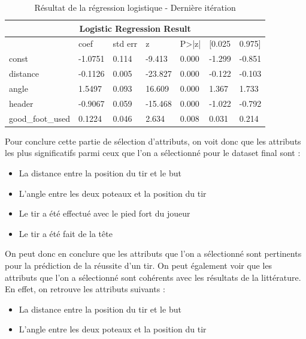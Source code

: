 \documentclass[12pt]{article}
\begin{document}
\begin{table}[htp]
    \centering
    \begin{tabular}{lllllll}
    \multicolumn{7}{c}{\textbf{Logistic Regression Result}}                                   \\ \hline
                     & coef    & std err & z       & P\textgreater{}|z| & {[}0.025 & 0.975{]} \\ \hline
    const            & -1.0751 & 0.114   & -9.413  & 0.000              & -1.299   & -0.851   \\
    distance         & -0.1126 & 0.005   & -23.827 & 0.000              & -0.122   & -0.103   \\
    angle            & 1.5497  & 0.093   & 16.609  & 0.000              & 1.367    & 1.733    \\
    header           & -0.9067 & 0.059   & -15.468 & 0.000              & -1.022   & -0.792   \\
    good\_foot\_used & 0.1224  & 0.046   & 2.634   & 0.008              & 0.031    & 0.214    \\ \hline
    \end{tabular}
    \caption{Résultat de la régression logistique - Dernière itération}
    \label{tab:logistic_regression_result_6}
\end{table}
\newpage
Pour conclure cette partie de sélection d'attributs, on voit donc que les attributs les plus significatifs parmi ceux que l'on a sélectionné pour le dataset final sont :
\begin{itemize}
    \item La distance entre la position du tir et le but
    \item L'angle entre les deux poteaux et la position du tir
    \item Le tir a été effectué avec le pied fort du joueur
    \item Le tir a été fait de la tête
\end{itemize}
On peut donc en conclure que les attributs que l'on a sélectionné sont pertinents pour la prédiction de la réussite d'un tir. 
On peut également voir que les attributs que l'on a sélectionné sont cohérents avec les résultats de la littérature. 
En effet, on retrouve les attributs suivants :
\begin{itemize}
    \item La distance entre la position du tir et le but
    \item L'angle entre les deux poteaux et la position du tir
\end{itemize}
\end{document}
